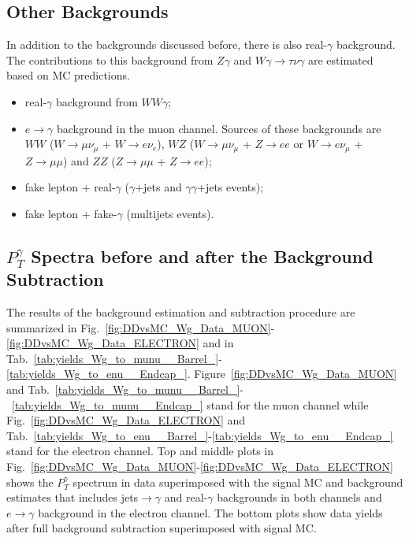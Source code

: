 

\subsection{Other Backgrounds}

In addition to the backgrounds discussed before, there is also real-$\gamma$ background. The contributions to this background from $Z\gamma$ and $W\gamma \rightarrow \tau \nu \gamma$ are estimated based on MC predictions.

\begin{itemize}
   \item real-$\gamma$ background from $WW\gamma$;  
   \item $e \rightarrow \gamma$ background in the muon channel. Sources of these backgrounds are $WW$ ($W \rightarrow \mu\nu_{\mu}$ + $W \rightarrow e\nu_e$), $WZ$ ($W \rightarrow \mu\nu_{\mu}$ + $Z \rightarrow ee$ or $W \rightarrow e\nu_{\mu}$ + $Z \rightarrow \mu\mu$) and $ZZ$ ($Z \rightarrow \mu\mu$ + $Z \rightarrow ee$);
   \item fake lepton + real-$\gamma$ ($\gamma$+jets and $\gamma\gamma$+jets events); 
   \item fake lepton + fake-$\gamma$ (multijets events).  
\end{itemize}

\subsection{$P_T^{\gamma}$ Spectra before and after the Background Subtraction}

The results of the background estimation and subtraction procedure are summarized in Fig.~\ref{fig:DDvsMC_Wg_Data_MUON}-\ref{fig:DDvsMC_Wg_Data_ELECTRON} and in Tab.~\ref{tab:yields_Wg_to_munu__Barrel_}-\ref{tab:yields_Wg_to_enu__Endcap_}. Figure~\ref{fig:DDvsMC_Wg_Data_MUON} and Tab.~\ref{tab:yields_Wg_to_munu__Barrel_}-~\ref{tab:yields_Wg_to_munu__Endcap_} stand for the muon channel while Fig.~\ref{fig:DDvsMC_Wg_Data_ELECTRON} and Tab.~\ref{tab:yields_Wg_to_enu__Barrel_}-\ref{tab:yields_Wg_to_enu__Endcap_} stand for the electron channel. Top and middle plots in Fig.~\ref{fig:DDvsMC_Wg_Data_MUON}-\ref{fig:DDvsMC_Wg_Data_ELECTRON} shows the $P_T^\gamma$ spectrum in data superimposed with the signal MC and background estimates that includes jets$\rightarrow\gamma$ and real-$\gamma$ backgrounds in both channels and $e\rightarrow\gamma$ background in the electron channel. The bottom plots show data yields after full background subtraction superimposed with signal MC. 

